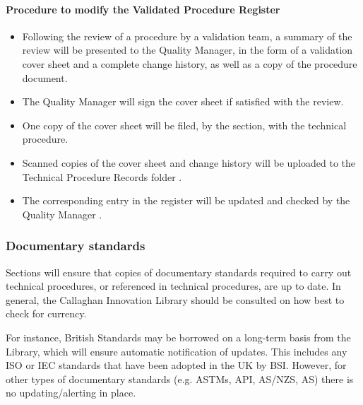 \paragraph{Procedure to modify the Validated Procedure Register}
\begin{itemize}
\item Following the review of a procedure by a validation team, a summary of the review will be presented to the Quality Manager, in the form of a validation cover sheet and a complete change history, as well as a copy of the procedure document.
\item The Quality Manager will sign the cover sheet if satisfied with the review.
\item One copy of the cover sheet will be filed, by the section, with the technical procedure. 
\item Scanned copies of the cover sheet and change history will be uploaded to the Technical Procedure Records folder .
\item The corresponding entry in the register will be updated  and checked by the Quality Manager .
\end{itemize} 

\subsubsection{Documentary standards}
Sections will ensure that copies of documentary standards required to carry out technical procedures, or referenced in technical procedures, are up to date. 
In general, the Callaghan Innovation Library should be consulted on how best to check for currency.

For instance, British Standards may be borrowed on a long-term basis from the Library, which will ensure automatic notification of updates. This includes any ISO or IEC standards that have been adopted in the UK by BSI. However, for other types of documentary standards (e.g. ASTMs, API, AS/NZS, AS) there is no updating/alerting in place. 
